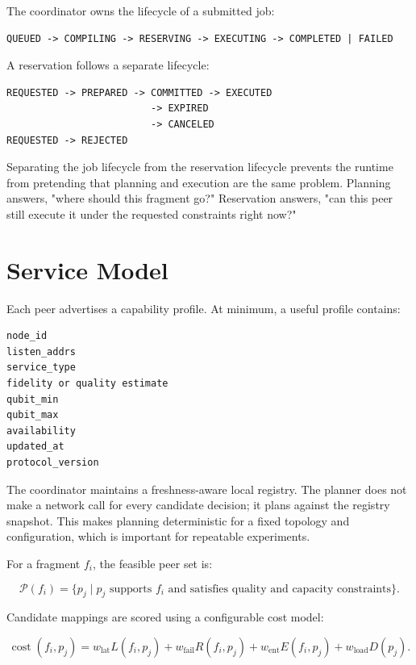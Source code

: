 \documentclass[11pt]{article}
\begin{document}
The coordinator owns the lifecycle of a submitted job:

\begin{lstlisting}[style=codestyle,caption={Workflow sketch.}]
QUEUED -> COMPILING -> RESERVING -> EXECUTING -> COMPLETED | FAILED
\end{lstlisting}

A reservation follows a separate lifecycle:

\begin{lstlisting}[style=codestyle,caption={Workflow sketch.}]
REQUESTED -> PREPARED -> COMMITTED -> EXECUTED
                         -> EXPIRED
                         -> CANCELED
REQUESTED -> REJECTED
\end{lstlisting}

Separating the job lifecycle from the reservation lifecycle prevents the runtime from pretending that planning and execution are the same problem. Planning answers, "where should this fragment go?" Reservation answers, "can this peer still execute it under the requested constraints right now?"

\section{Service Model}

Each peer advertises a capability profile. At minimum, a useful profile contains:

\begin{lstlisting}[style=codestyle,caption={Workflow sketch.}]
node_id
listen_addrs
service_type
fidelity or quality estimate
qubit_min
qubit_max
availability
updated_at
protocol_version
\end{lstlisting}

The coordinator maintains a freshness-aware local registry. The planner does not make a network call for every candidate decision; it plans against the registry snapshot. This makes planning deterministic for a fixed topology and configuration, which is important for repeatable experiments.

For a fragment \(f_i\), the feasible peer set is:

\[
\mathcal{P}(f_i)=\{p_j \mid p_j \text{ supports } f_i \text{ and satisfies quality and capacity constraints}\}.
\]

Candidate mappings are scored using a configurable cost model:

\[
\operatorname{cost}(f_i,p_j)
=
w_{\mathrm{lat}}L(f_i,p_j)
+
w_{\mathrm{fail}}R(f_i,p_j)
+
w_{\mathrm{ent}}E(f_i,p_j)
+
w_{\mathrm{load}}D(p_j).
\]
\end{document}
